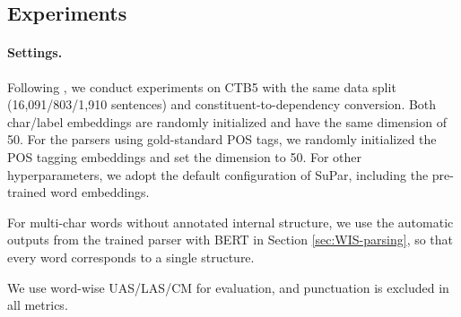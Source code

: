 \subsection{Experiments}

\paragraph{Settings.} Following \citet{chen-manning-2014fast}, we conduct experiments on CTB5 with the same data split (16,091/803/1,910 sentences) and constituent-to-dependency conversion. 
Both char/label embeddings are randomly initialized and have the same dimension of 50. 
For the parsers using gold-standard POS tags, we randomly initialized the POS tagging embeddings and set the dimension to 50.
For other hyperparameters, we adopt the default configuration of SuPar, including the pre-trained word embeddings. 

For multi-char words without annotated internal structure, we use the automatic outputs from the trained parser with BERT in Section \ref{sec:WIS-parsing}, so that every word corresponds to a single structure.  

We use word-wise UAS/LAS/CM for evaluation, and punctuation is excluded in all metrics.

